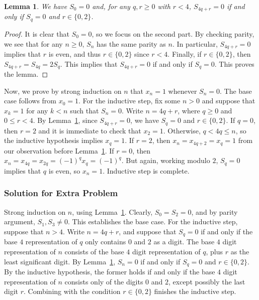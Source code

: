 \documentclass{article}
\newtheorem{lemma}{Lemma}
\begin{document}
\begin{lemma}\label{2010a4-1}
We have $S_0 = 0$ and, for any $q, r \geq 0$ with $r < 4$, $S_{4q + r} = 0$ if and only if $S_q = 0$ and $r \in \{0, 2\}$.
\end{lemma}
\begin{proof}
It is clear that $S_0 = 0$, so we focus on the second part.
By checking parity, we see that for any $n \geq 0$, $S_n$ has the same parity as $n$.
In particular, $S_{4q + r} = 0$ implies that $r$ is even, and thus $r \in \{0, 2\}$ since $r < 4$.
Finally, if $r \in \{0, 2\}$, then $S_{4q + r} = S_{4q} = 2 S_q$.
This implies that $S_{4q + r} = 0$ if and only if $S_q = 0$.
This proves the lemma.
\end{proof}

Now, we prove by strong induction on $n$ that $x_n = 1$ whenever $S_n = 0$.
The base case follows from $x_0 = 1$.
For the inductive step, fix some $n > 0$ and suppose that $x_k = 1$ for any $k < n$ such that $S_n = 0$.
Write $n = 4q + r$, where $q \geq 0$ and $0 \leq r < 4$.
By Lemma~\ref{2010a4-1}, since $S_{4q + r} = 0$, we have $S_q = 0$ and $r \in \{0, 2\}$.
If $q = 0$, then $r = 2$ and it is immediate to check that $x_2 = 1$.
Otherwise, $q < 4q \leq n$, so the inductive hypothesis implies $x_q = 1$.
If $r = 2$, then $x_n = x_{4q + 2} = x_q = 1$ from our observation before Lemma~\ref{2010a4-1}.
If $r = 0$, then $x_n = x_{4q} = x_{2q} = (-1)^q x_q = (-1)^q$.
But again, working modulo $2$, $S_q = 0$ implies that $q$ is even, so $x_n = 1$.
Inductive step is complete.


\subsubsection*{Solution for Extra Problem}

Strong induction on $n$, using Lemma~\ref{2010a4-1}.
Clearly, $S_0 = S_2 = 0$, and by parity argument, $S_1, S_3 \neq 0$.
This establishes the base case.
For the inductive step, suppose that $n > 4$.
Write $n = 4q + r$, and suppose that $S_q = 0$ if and only if the base $4$ representation of $q$ only contains $0$ and $2$ as a digit.
The base $4$ digit representation of $n$ consists of the base $4$ digit representation of $q$, plus $r$ as the least significant digit.
By Lemma~\ref{2010a4-1}, $S_n = 0$ if and only if $S_q = 0$ and $r \in \{0, 2\}$.
By the inductive hypothesis, the former holds if and only if the base $4$ digit representation of $n$ consists only of the digits $0$ and $2$, except possibly the last digit $r$.
Combining with the condition $r \in \{0, 2\}$ finishes the inductive step.
\end{document}
